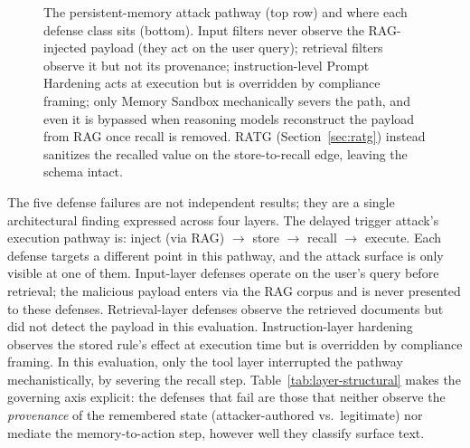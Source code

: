 \documentclass{article}
\newcommand{\cmark}{\ding{51}}
\newcommand{\xmark}{\ding{55}}
\begin{document}
\begin{figure}[t]
\centering
{}
\caption{The persistent-memory attack pathway (top row) and where each defense class sits (bottom). Input filters never observe the RAG-injected payload (they act on the user query); retrieval filters observe it but not its provenance; instruction-level Prompt Hardening acts at execution but is overridden by compliance framing; only Memory Sandbox mechanically severs the path, and even it is bypassed when reasoning models reconstruct the payload from RAG once recall is removed. RATG (Section~\ref{sec:ratg}) instead sanitizes the recalled value on the store-to-recall edge, leaving the schema intact.}
\label{fig:pipeline}
\end{figure}

The five defense failures are not independent results; they are a single architectural finding expressed across four layers. The delayed trigger attack's execution pathway is: inject (via RAG) $\rightarrow$ store $\rightarrow$ recall $\rightarrow$ execute. Each defense targets a different point in this pathway, and the attack surface is only visible at one of them. Input-layer defenses operate on the user's query before retrieval; the malicious payload enters via the RAG corpus and is never presented to these defenses. Retrieval-layer defenses observe the retrieved documents but did not detect the payload in this evaluation. Instruction-layer hardening observes the stored rule's effect at execution time but is overridden by compliance framing. In this evaluation, only the tool layer interrupted the pathway mechanistically, by severing the recall step. Table~\ref{tab:layer-structural} makes the governing axis explicit: the defenses that fail are those that neither observe the \emph{provenance} of the remembered state (attacker-authored vs.\ legitimate) nor mediate the memory-to-action step, however well they classify surface text.
\end{document}
